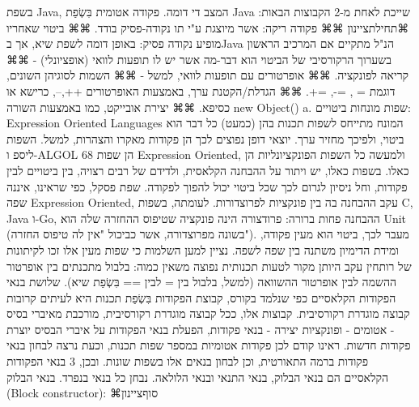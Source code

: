         בשפת Java, המצב די דומה. פקודה אטומית בִּשְׂפַת Java שייכת לאחת מ-2 הקבוצות הבאות:
        ⌘תחילת{ציינון}
        ⌘⌘ פקודה ריקה: אשר מיוצגת ע"י תו נקודה-פסיק בודד.
        ⌘⌘ ביטוי שאחריו מופיע נקודה פסיק: באופן דומה לשפת שיא, אך בJava הנ"ל מתקיים אם המרכיב הראשון בשערוך הרקורסיבי של הביטוי הוא דבר-מה אשר יש לו תופעות לוואי (אופציונלי) -
        ⌘⌘ קריאה לפונקציה.
        ⌘⌘ אופרטורים עם תופעות לוואי, למשל -
        ⌘⌘ השמות לסוגיהן השונים, דוגמת = , =-, =+.
        ⌘⌘ הגדלת/הקטנת ערך, באמצעות האופרטורים ++,--, כרישא או כסיפא.
        ⌘⌘ יצירת אובייקט, כמו באמצעות השורה new Object() a.
        שפות מונחות ביטויים: Expression Oriented Languages
        המונח מתייחס לשפות תכנות בהן (כמעט) כל דבר הוא ביטוי, ולפיכך מחזיר ערך. יוצאי דופן נפוצים לכך הן פקודות מאקרו והצהרות, למשל. השפות ליספ ו-ALGOL 68 הן שפות Expression Oriented, ולמעשה כל השפות הפונקציונליות הן כאלו. בשפות כאלו, יש ויתור על ההבחנה הקלאסית, ולדידם של רבים רצויה, בין ביטויים לבין פקודות, וחל ניסיון לגרום לכך שכל ביטוי יכול להפוך לפקודה.
        שפת פסקל, כפי שראינו, איננה שפה Expression Oriented, עקב ההבחנה בה בין פונקציות לפרוצדורות. לעומתה, בשפות C, Java ו-Go, ההבחנה פחות ברורה: פרודצורה הינה פונקציה שטיפוס ההחזרה שלה הוא Unit (בשונה מפרוצדורה, אשר כביכול "אין לה טיפוס החזרה"). מעבר לכך, ביטוי הוא מעין פקודה, ומידת הדימיון משתנה בין שפה לשפה.
        נציין למען השלמות כי שפות מעין אלו זכו לקיתונות של רותחין עקב היותן מקור לטעות תכנותית נפוצה משאין כמוה: בלבול מתכנתים בין אופרטור ההשמה לבין אופרטור ההשוואה (למשל, בלבול בין = לבין == בִּשְׂפַת שיא).
        שלושת בנאי הפקודות הקלאסיים
        כפי שנלמד בקורס, קבוצת הפקודות בִּשְׂפַת תכנות היא לעיתים קרובות קבוצה מוגדרת רקורסיבית. קבוצות אלו, ככל קבוצה מוגדרת רקורסיבית, מורכבת מאיברי בסיס - אטומים - ופונקציות יצירה - בנאי פקודות, הפעלת בנאי הפקודות על איברי הבסיס יוצרת פקודות חדשות. ראינו קודם לכן פקודות אטומיות במספר שפות תכנות, וכעת נרצה לבחון בנאי פקודות ברמה התאורטית, וכן לבחון בנאים אלו בשפות שונות. ובכן, 3 בנאי הפקודות הקלאסיים הם בנאי הבלוק, בנאי התנאי ובנאי הלולאה. נבחן כל בנאי בנפרד.
        בנאי הבלוק (Block constructor):
    ⌘סוף{ציינון}

